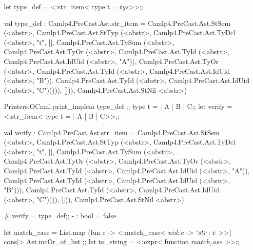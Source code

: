 \begin{enumerate}
\begin{redcode}
let type_def = <:str_item< type t = $tys$>>;;
\end{redcode}

\begin{bluecode}
val type_def : Camlp4.PreCast.Ast.str_item =
  Camlp4.PreCast.Ast.StSem (<abstr>,
   Camlp4.PreCast.Ast.StTyp (<abstr>,
    Camlp4.PreCast.Ast.TyDcl (<abstr>, "t", [],
     Camlp4.PreCast.Ast.TySum (<abstr>,
      Camlp4.PreCast.Ast.TyOr (<abstr>,
       Camlp4.PreCast.Ast.TyId (<abstr>,
        Camlp4.PreCast.Ast.IdUid (<abstr>, "A")),
       Camlp4.PreCast.Ast.TyOr (<abstr>,
        Camlp4.PreCast.Ast.TyId (<abstr>,
         Camlp4.PreCast.Ast.IdUid (<abstr>, "B")),
        Camlp4.PreCast.Ast.TyId (<abstr>,
         Camlp4.PreCast.Ast.IdUid (<abstr>, "C"))))),
     [])),
     Camlp4.PreCast.Ast.StNil <abstr>)
\end{bluecode}
   
\begin{alternate}
Printers.OCaml.print_implem type_def ;;
type t = | A | B | C;;
let verify = <:str_item< type t = | A | B | C>>;;
\end{alternate}

\begin{bluecode}
val verify : Camlp4.PreCast.Ast.str_item =
  Camlp4.PreCast.Ast.StSem (<abstr>,
   Camlp4.PreCast.Ast.StTyp (<abstr>,
    Camlp4.PreCast.Ast.TyDcl (<abstr>, "t", [],
     Camlp4.PreCast.Ast.TySum (<abstr>,
      Camlp4.PreCast.Ast.TyOr (<abstr>,
       Camlp4.PreCast.Ast.TyOr (<abstr>,
        Camlp4.PreCast.Ast.TyId (<abstr>,
         Camlp4.PreCast.Ast.IdUid (<abstr>, "A")),
        Camlp4.PreCast.Ast.TyId (<abstr>,
         Camlp4.PreCast.Ast.IdUid (<abstr>, "B"))),
       Camlp4.PreCast.Ast.TyId (<abstr>,
        Camlp4.PreCast.Ast.IdUid (<abstr>, "C")))),
     [])),
   Camlp4.PreCast.Ast.StNil <abstr>)
\end{bluecode}
 
\begin{alternate} 
# verify = type_def;;
- : bool = false
\end{alternate}


\begin{redcode}
let match_case = List.map (fun c -> <:match_case< $uid:c$ -> $`str:c$ >>) cons|> Ast.mcOr_of_list ;;
let to_string = <:expr< function $match_case$ >>;;
\end{redcode}


\end{enumerate}

